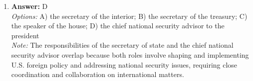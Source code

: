 \documentclass[12pt]{article}
\begin{document}
\begin{enumerate}[label=\arabic*.]
\\ \textit{Note:} The president has the constitutional authority to grant reprieves and pardons as a check on judicial power, which does not require congressional approval.
\item \textbf{Answer:} D
\\ \textit{Options:} A) the secretary of the interior; B) the secretary of the treasury; C) the speaker of the house; D) the chief national security advisor to the president
\\ \textit{Note:} The responsibilities of the secretary of state and the chief national security advisor overlap because both roles involve shaping and implementing U.S. foreign policy and addressing national security issues, requiring close coordination and collaboration on international matters.
\end{enumerate}
\end{document}
